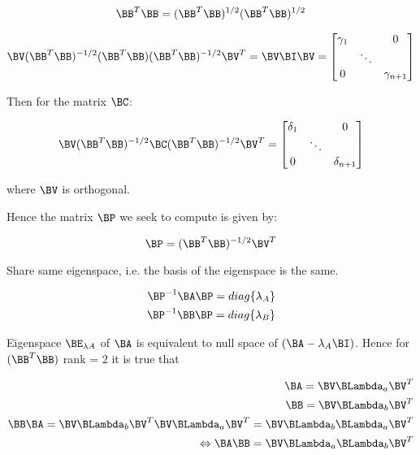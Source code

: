\begin{equation} \label{eq:A.9}
\BB^{T}\BB = (\BB^{T}\BB)^{1/2}(\BB^{T}\BB)^{1/2}
\end{equation}

\begin{equation} \label{eq:A.10}
\BV(\BB^{T}\BB)^{-1/2}(\BB^{T}\BB)(\BB^{T}\BB)^{-1/2}\BV^{T} = \BV\BI\BV = \begin{bmatrix}
\gamma_1 & & 0 \\
 & \ddots & \\
0 & & \gamma_{n+1}
\end{bmatrix}
\end{equation}

Then for the matrix $\BC$:

\begin{equation} \label{eq:A.11}
\BV(\BB^{T}\BB)^{-1/2}\BC(\BB^{T}\BB)^{-1/2}\BV^{T} = \begin{bmatrix}
\delta_1 & & 0 \\
 & \ddots & \\
0 & & \delta_{n+1}
\end{bmatrix}
\end{equation}

where $\BV$ is orthogonal.

Hence the matrix $\BP$ we seek to compute is given by:

\begin{equation} \label{eq:A.12}
\BP = (\BB^T\BB)^{-1/2}\BV^T
\end{equation}

Share same eigenspace, i.e. the basis of the eigenspace is the same.

\begin{eqnarray}
\BP^{-1}\BA\BP = diag\{\lambda_A\} \\
\nonumber
\BP^{-1}\BB\BP = diag\{\lambda_B\}
\end{eqnarray}

Eigenspace $\BE_{\lambda A}$ of $\BA$ is equivalent to null 
space of $(\BA - \lambda_A\BI)$. 
Hence for $(\BB^T\BB)$ rank = 2 it is true
that

\begin{eqnarray}
\BA = \BV\BLambda_a\BV^T \\
\BB = \BV\BLambda_b\BV^T \\
\BB\BA = \BV\BLambda_b\BV^T\BV\BLambda_a\BV^T = \BV\BLambda_b\BLambda_a\BV^T \\
\Leftrightarrow \BA\BB = \BV\BLambda_a\BLambda_b\BV^T
\end{eqnarray}

